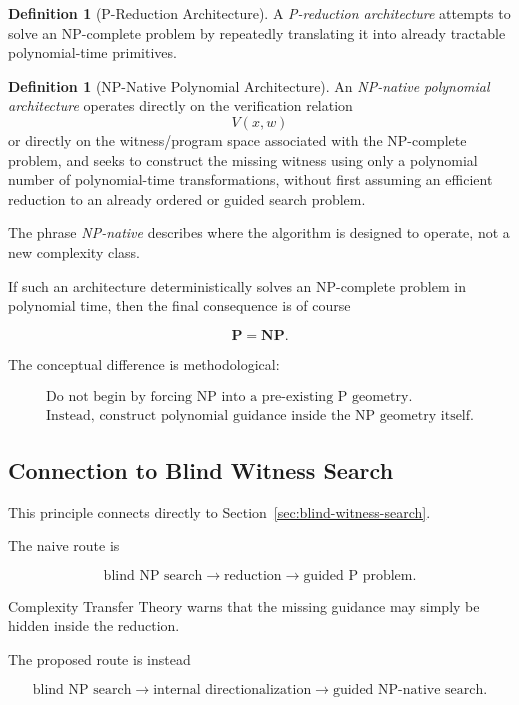 \documentclass[11pt]{article}
\theoremstyle{plain}
\theoremstyle{definition}
\newtheorem{definition}[theorem]{Definition}
\begin{document}
\begin{definition}[P-Reduction Architecture]
A \emph{P-reduction architecture} attempts to solve an NP-complete problem by
repeatedly translating it into already tractable polynomial-time primitives.
\end{definition}

\begin{definition}[NP-Native Polynomial Architecture]
\label{def:np-native}
An \emph{NP-native polynomial architecture} operates directly on the
verification relation
\[
    V(x,w)
\]
or directly on the witness/program space associated with the NP-complete
problem, and seeks to construct the missing witness using only a polynomial
number of polynomial-time transformations, without first assuming an
efficient reduction to an already ordered or guided search problem.
\end{definition}

The phrase \emph{NP-native} describes where the algorithm is designed to
operate, not a new complexity class.

If such an architecture deterministically solves an NP-complete problem in
polynomial time, then the final consequence is of course

\[
    \mathbf{P}=\mathbf{NP}.
\]

The conceptual difference is methodological:

\[
\boxed{
\begin{array}{c}
\text{Do not begin by forcing NP into a pre-existing P geometry.}\\[4pt]
\text{Instead, construct polynomial guidance inside the NP geometry itself.}
\end{array}
}
\]

\subsection{Connection to Blind Witness Search}

This principle connects directly to
Section~\ref{sec:blind-witness-search}.

The naive route is

\[
    \text{blind NP search}
    \longrightarrow
    \text{reduction}
    \longrightarrow
    \text{guided P problem}.
\]

Complexity Transfer Theory warns that the missing guidance may simply be
hidden inside the reduction.

The proposed route is instead

\[
    \text{blind NP search}
    \longrightarrow
    \text{internal directionalization}
    \longrightarrow
    \text{guided NP-native search}.
\]
\end{document}
